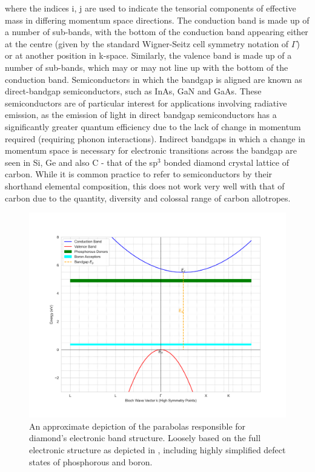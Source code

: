 \begin{refsection}
where the indices i, j are used to indicate the tensorial components of effective mass in differing momentum space directions. The conduction band is made up of a number of sub-bands, with the bottom of the conduction band appearing either at the centre (given by the standard Wigner-Seitz cell symmetry notation of $\Gamma$) or at another position in k-space. Similarly, the valence band is made up of a number of sub-bands, which may or may not line up with the bottom of the conduction band. Semiconductors in which the bandgap is aligned are known as direct-bandgap semiconductors, such as InAs, GaN and GaAs. These semiconductors are of particular interest for applications involving radiative emission, as the emission of light in direct bandgap semiconductors has a significantly greater quantum efficiency due to the lack of change in momentum required (requiring phonon interactions). Indirect bandgaps in which a change in momentum space is necessary for electronic transitions across the bandgap are seen in Si, Ge and also C - that of the sp$^{3}$ bonded diamond crystal lattice of carbon. While it is common practice to refer to semiconductors by their shorthand elemental composition, this does not work very well with that of carbon due to the quantity, diversity and colossal range of carbon allotropes.

\begin{figure}[H]
    \centering
    \includegraphics[width=\textwidth]{Chapter2/Figs/Raster/python_band_structure.png}
    \caption{An approximate depiction of the parabolas responsible for diamond's electronic band structure. Loosely based on the full electronic structure as depicted in \cite{Willatzen1994}, including highly simplified defect states of phosphorous and boron.}
    \label{fig:band_parabolas}
\end{figure}


\end{refsection}
